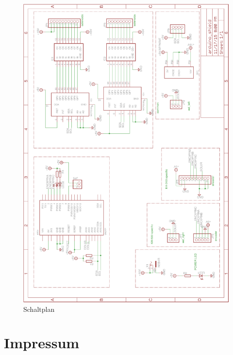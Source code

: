 \documentclass[fleqn,10pt]{SelfArx} %
\begin{document}
 \begin{figure}[tbhp]\centering %
 \includegraphics[width=0.9\linewidth]{schaltplan}
 \caption{Schaltplan}
 \end{figure}

\FloatBarrier

\section*{Impressum} %

\end{document}
